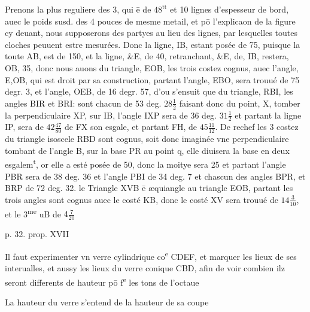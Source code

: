 \documentclass[11pt,a4paper]{article}
\begin{document}
Prenons la plus reguliere des 3, qui ē de $48^{\text{tt}}$ et 10 lignes d'espesseur de bord, auec le poids susd. des 4 pouces de mesme metail, et pō l'explicaon de la figure cy deuant, nous supposerons des partyes au lieu des lignes, par lesquelles toutes cloches peuuent estre mesurées. Donc la ligne, IB, estant posée de 75, puisque la toute AB, est de 150, et la ligne, \&E, de 40, retranchant, \&E, de, IB, restera, OB, 35, donc nous auons du triangle, EOB, les trois costez cognus, auec l'angle, E,OB, qui est droit par sa construction, partant l'angle, EBO, sera trouué de 75 degr. 3, et l'angle, OEB, de 16 degr. 57, d'ou s'ensuit que du triangle, RBI, les angles BIR et BRI: sont chacun de 53 deg. $28\frac{1}{2}$ faisant donc du point, X, tomber la perpendiculaire XP, sur IB, l'angle IXP sera de 36 deg. $31\frac{1}{2}$ et partant la ligne IP, sera de $42\frac{47}{80}$ de FX son esgale, et partant FH, de $45\frac{11}{12}$. De rechef les 3 costez du triangle isoscele RBD sont cognus, soit donc imaginée vne perpendiculaire tombant de l'angle B, sur la base PR au point q, elle diuisera la base en deux esgalem\textsuperscript{t}, or elle a esté posée de 50, donc la moitye sera 25 et partant l'angle PBR sera de \struck{\ill{}} 38 deg. 36 et l'angle PBI de 34 deg. 7 et chascun des angles BPR, et BRP de 72 deg. 32. le Triangle XVB ē æquiangle au triangle EOB, partant les trois angles sont cognus auec le costé KB, donc le costé XV sera trouué de $14\frac{3}{10}$, et le 3\textsuperscript{me} uB de $4\frac{7}{20}$

p. 32. prop. XVII

Il faut experimenter vn verre cylindrique co\textsuperscript{e} CDEF, et marquer les lieux de ses interualles, et aussy les lieux du verre conique CBD, afin de voir combien ilz seront differents de hauteur pō f\textsuperscript{e} les tons de l'octaue

La hauteur du verre s'entend de la hauteur de sa coupe
\end{document}
